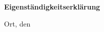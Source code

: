 {\Large \textbf{Eigenständigkeitserklärung}}

\vspace{1cm}

\makeatletter
Ort, den {\@date}

\vspace{2.5cm}
\@author
\makeatother